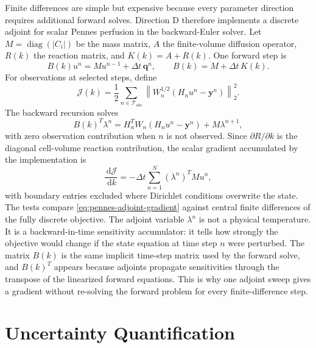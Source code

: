 \documentclass[11pt]{article}
\numberwithin{equation}{section}
\newcommand{\dd}{\,\mathrm{d}}
\newcommand{\diag}{\operatorname{diag}}
\newcommand{\norm}[1]{\left\lVert #1 \right\rVert}
\begin{document}
Finite differences are simple but expensive because every parameter direction
requires additional forward solves.  Direction D therefore implements a
discrete adjoint for scalar Pennes perfusion in the backward-Euler solver.  Let
$M=\diag(|C_i|)$ be the mass matrix, $A$ the finite-volume diffusion operator,
$R(k)$ the reaction matrix, and $K(k)=A+R(k)$.  One forward step is
\begin{equation}
  B(k)u^n = M u^{n-1} + \Delta t\,\bm{q}^n,
  \qquad
  B(k)=M+\Delta t\,K(k).
  \label{eq:be-forward}
\end{equation}
For observations at selected steps, define
\begin{equation}
  \mathcal{J}(k)
  =
  \frac{1}{2}
  \sum_{n\in\mathcal{T}_{obs}}
  \norm{W_n^{1/2}\left(H_nu^n-\bm{y}^n\right)}_2^2.
  \label{eq:adjoint-objective}
\end{equation}
The backward recursion solves
\begin{equation}
  B(k)^T\lambda^n
  =
  H_n^TW_n(H_nu^n-\bm{y}^n)
  +
  M\lambda^{n+1},
  \label{eq:adjoint-recursion}
\end{equation}
with zero observation contribution when $n$ is not observed.  Since
$\partial R/\partial k$ is the diagonal cell-volume reaction contribution, the
scalar gradient accumulated by the implementation is
\begin{equation}
  \frac{\dd \mathcal{J}}{\dd k}
  =
  -\Delta t
  \sum_{n=1}^{N}
  \left(\lambda^n\right)^T
  M u^n,
  \label{eq:pennes-adjoint-gradient}
\end{equation}
with boundary entries excluded where Dirichlet conditions overwrite the state.
The tests compare \cref{eq:pennes-adjoint-gradient} against central finite
differences of the fully discrete objective.
The adjoint variable $\lambda^n$ is not a physical temperature.  It is a
backward-in-time sensitivity accumulator: it tells how strongly the objective
would change if the state equation at time step $n$ were perturbed.  The matrix
$B(k)$ is the same implicit time-step matrix used by the forward solve, and
$B(k)^T$ appears because adjoints propagate sensitivities through the transpose
of the linearized forward equations.  This is why one adjoint sweep gives a
gradient without re-solving the forward problem for every finite-difference
step.

\section{Uncertainty Quantification}
\end{document}

